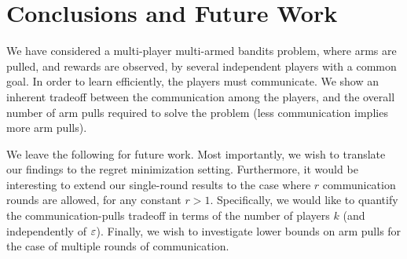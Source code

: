 
\section{Conclusions and Future Work} \label{sec:conc}

We have considered a multi-player multi-armed bandits problem, where arms are pulled, and rewards are observed, by several independent players with a common goal. 
In order to learn efficiently, the players must communicate. 
We show an inherent tradeoff between the communication among the players, and the overall number of arm pulls required to solve the problem (less communication implies more arm pulls). 

We leave the following for future work. 
Most importantly, we wish to translate our findings to the regret minimization setting.
Furthermore, it would be interesting to extend our single-round results to the case where $r$ communication rounds are allowed, for any constant $r>1$. 
Specifically, we would like to quantify the communication-pulls tradeoff in terms of the number of players $k$ (and independently of $\varepsilon$). 
Finally, we wish to investigate lower bounds on arm pulls for the case of multiple rounds of communication. 
